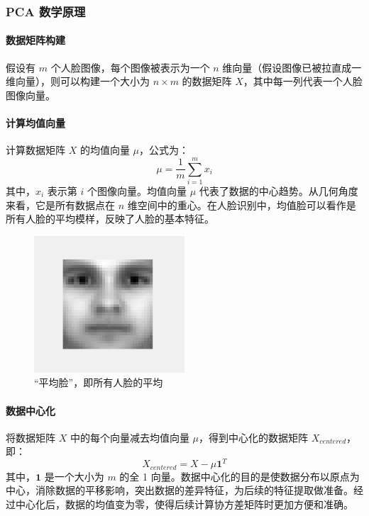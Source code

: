 \documentclass{article}
\begin{document}
\subsubsection{PCA 数学原理}

\paragraph{数据矩阵构建}
假设有 $m$ 个人脸图像，每个图像被表示为一个 $n$ 维向量（假设图像已被拉直成一维向量），则可以构建一个大小为 $n\times m$ 的数据矩阵 $X$，其中每一列代表一个人脸图像向量。

\paragraph{计算均值向量}
计算数据矩阵 $X$ 的均值向量 $\mu$，公式为：
\[
\mu=\frac{1}{m}\sum_{i = 1}^{m}x_{i}
\]
其中，$x_{i}$ 表示第 $i$ 个图像向量。均值向量 $\mu$ 代表了数据的中心趋势。从几何角度来看，它是所有数据点在 $n$ 维空间中的重心。在人脸识别中，均值脸可以看作是所有人脸的平均模样，反映了人脸的基本特征。

\begin{figure}[H]
    \centering
    \includegraphics[width=0.5\textwidth]{Img/v2-918060b552a96c398d46f84574d5f2e4_1440w.png}
    \caption{“平均脸”，即所有人脸的平均}
\end{figure}

\paragraph{数据中心化}
将数据矩阵 $X$ 中的每个向量减去均值向量 $\mu$，得到中心化的数据矩阵 $X_{centered}$，即：
\[
X_{centered}=X - \mu\mathbf{1}^{T}
\]
其中，$\mathbf{1}$ 是一个大小为 $m$ 的全 1 向量。数据中心化的目的是使数据分布以原点为中心，消除数据的平移影响，突出数据的差异特征，为后续的特征提取做准备。经过中心化后，数据的均值变为零，使得后续计算协方差矩阵时更加方便和准确。
\end{document}
